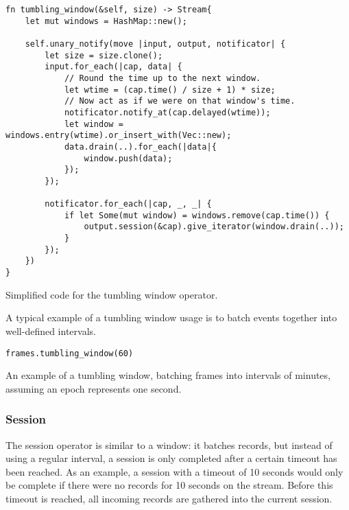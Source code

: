 \begin{listing}[H]
\begin{verbatim}
fn tumbling_window(&self, size) -> Stream{
    let mut windows = HashMap::new();
    
    self.unary_notify(move |input, output, notificator| {
        let size = size.clone();
        input.for_each(|cap, data| {
            // Round the time up to the next window.
            let wtime = (cap.time() / size + 1) * size;
            // Now act as if we were on that window's time.
            notificator.notify_at(cap.delayed(wtime));
            let window = windows.entry(wtime).or_insert_with(Vec::new);
            data.drain(..).for_each(|data|{
                window.push(data);
            });
        });
        
        notificator.for_each(|cap, _, _| {
            if let Some(mut window) = windows.remove(cap.time()) {
                output.session(&cap).give_iterator(window.drain(..));
            }
        });
    })
}
\end{verbatim}
  \caption{Simplified code for the tumbling window operator.}
  \label{lst:tumbling-window}
\end{listing}

A typical example of a tumbling window usage is to batch events together into well-defined intervals.

\begin{listing}[H]
\begin{verbatim}
frames.tumbling_window(60)
\end{verbatim}
\caption{An example of a tumbling window, batching frames into intervals of minutes, assuming an epoch represents one second.}
\label{lst:tumbling-window-example}
\end{listing}

\subsubsection{Session}
The session operator is similar to a window: it batches records, but instead of using a regular interval, a session is only completed after a certain timeout has been reached. As an example, a session with a timeout of 10 seconds would only be complete if there were no records for 10 seconds on the stream. Before this timeout is reached, all incoming records are gathered into the current session.


